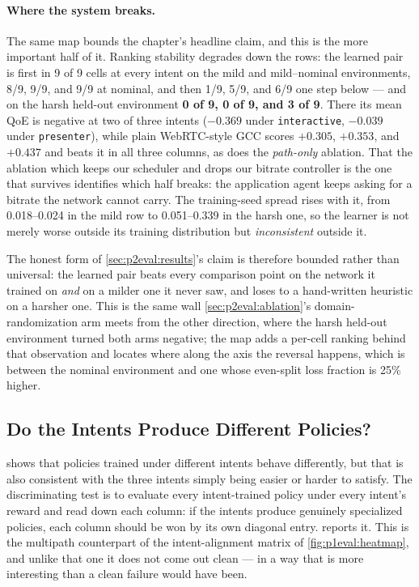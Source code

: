 \paragraph{Where the system breaks.} The same map bounds the chapter's headline claim, and this is the
more important half of it. Ranking stability degrades down the rows: the learned pair is first in 9 of 9
cells at every intent on the mild and mild--nominal environments, 8/9, 9/9, and 9/9 at nominal, and then
1/9, 5/9, and 6/9 one step below --- and on the harsh held-out environment \textbf{0 of 9, 0 of 9, and 3
of 9}. There its mean QoE is negative at two of three intents ($-0.369$ under \texttt{interactive},
$-0.039$ under \texttt{presenter}), while plain WebRTC-style GCC scores $+0.305$, $+0.353$, and $+0.437$
and beats it in all three columns, as does the \emph{path-only} ablation. That the ablation which keeps
our scheduler and drops our bitrate controller is the one that survives identifies which half breaks:
the application agent keeps asking for a bitrate the network cannot carry. The training-seed spread
rises with it, from 0.018--0.024 in the mild row to 0.051--0.339 in the harsh one, so the learner is not
merely worse outside its training distribution but \emph{inconsistent} outside it.

The honest form of \cref{sec:p2eval:results}'s claim is therefore bounded rather than universal: the
learned pair beats every comparison point on the network it trained on \emph{and} on a milder one it
never saw, and loses to a hand-written heuristic on a harsher one. This is the same wall
\cref{sec:p2eval:ablation}'s domain-randomization arm meets from the other direction, where the harsh
held-out environment turned both arms negative; the map adds a per-cell ranking behind that observation
and locates where along the axis the reversal happens, which is between the nominal environment and one
whose even-split loss fraction is 25\% higher.

\subsection{Do the Intents Produce Different Policies?}
\label{sec:p2eval:transfer}

 shows that policies trained under different intents behave differently, but that is
also consistent with the three intents simply being easier or harder to satisfy. The discriminating test
is to evaluate every intent-trained policy under every intent's reward and read down each column: if the
intents produce genuinely specialized policies, each column should be won by its own diagonal entry.
 reports it. This is the multipath counterpart of the intent-alignment matrix of
\cref{fig:p1eval:heatmap}, and unlike that one it does not come out clean --- in a way that is more
interesting than a clean failure would have been.

